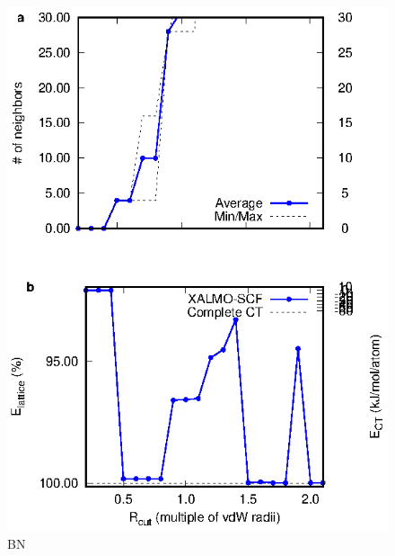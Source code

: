 \documentclass[aps,prb,twocolumn,amsmath,amssymb,superscriptaddress,longbibliography]{revtex4-1}
\begin{document}
\begin{figure}
\includegraphics[scale=1]{plots/BN_EvR}
\caption{BN}
\label{bngraph}
\end{figure}





\end{document}
